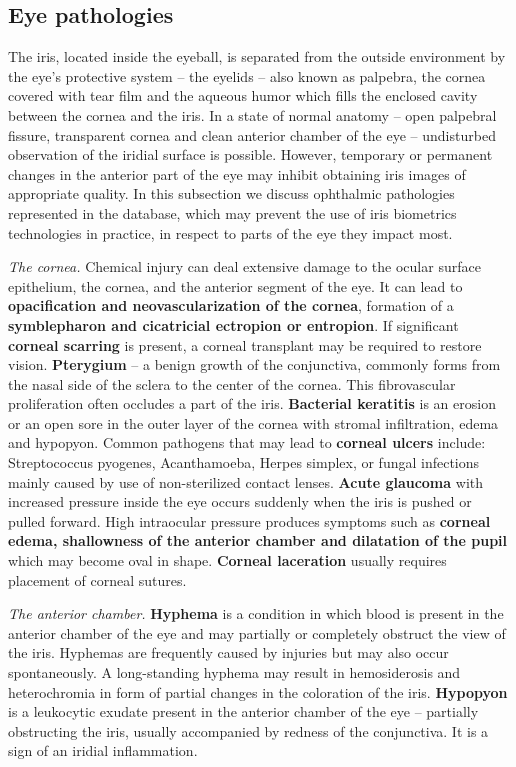 \documentclass[10pt,twocolumn,letterpaper]{article}
\begin{document}
\subsection{Eye pathologies}
The iris, located inside the eyeball, is separated from the outside environment by the eye’s protective system -- the eyelids -- also known as palpebra, the cornea covered with tear film and the aqueous humor which fills the enclosed cavity between the cornea and the iris. In a state of normal anatomy -- open palpebral fissure, transparent cornea and clean anterior chamber of the eye -- undisturbed observation of the iridial surface is possible. However, temporary or permanent changes in the anterior part of the eye may inhibit obtaining iris images of appropriate quality. In this subsection we discuss ophthalmic pathologies represented in the database, which may prevent the use of iris biometrics technologies in practice, in respect to parts of the eye they impact most.

\textit{The cornea.} Chemical injury can deal extensive damage to the ocular surface epithelium, the cornea, and the anterior segment of the eye. It can lead to \textbf{opacification and neovascularization of the cornea}, formation of a \textbf{symblepharon and cicatricial ectropion or entropion}. If significant \textbf{corneal scarring} is present, a corneal transplant may be required to restore vision. \textbf{Pterygium} -- a benign growth of the conjunctiva, commonly forms from the nasal side of the sclera to the center of the cornea. This fibrovascular proliferation often occludes a part of the iris. \textbf{Bacterial keratitis} is an erosion or an open sore in the outer layer of the cornea with stromal infiltration, edema and hypopyon. Common pathogens that may lead to \textbf{corneal ulcers} include: Streptococcus pyogenes, Acanthamoeba, Herpes simplex, or fungal infections mainly caused by use of non-sterilized contact lenses. \textbf{Acute glaucoma} with increased pressure inside the eye occurs suddenly when the iris is pushed or pulled forward. High intraocular pressure produces symptoms such as \textbf{corneal edema, shallowness of the anterior chamber and dilatation of the pupil} which may become oval in shape. \textbf{Corneal laceration} usually requires placement of corneal sutures.

\textit{The anterior chamber.} \textbf{Hyphema} is a condition in which blood is present in the anterior chamber of the eye and may partially or completely obstruct the view of the iris. Hyphemas are frequently caused by injuries but may also occur spontaneously. A long-standing hyphema may result in hemosiderosis and heterochromia in form of partial changes in the coloration of the iris. \textbf{Hypopyon} is a leukocytic exudate present in the anterior chamber of the eye -- partially obstructing the iris, usually accompanied by redness of the conjunctiva. It is a sign of an iridial inflammation.
\end{document}
